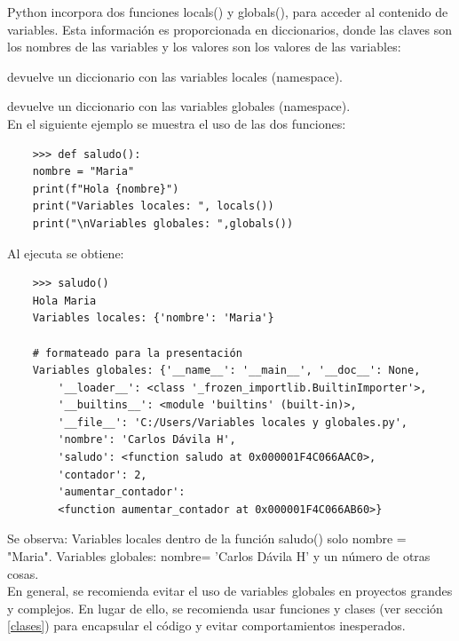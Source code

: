 

Python incorpora dos funciones {\ttfamily locals()} y {\ttfamily globals()}, para acceder al contenido de variables. Esta información es proporcionada en diccionarios, donde las {\ttfamily claves} son los nombres de las variables y los {\ttfamily valores} son los valores de las variables:

  devuelve un diccionario con las variables locales (namespace).

 devuelve un diccionario con las  variables globales (namespace).\\

En el siguiente ejemplo se muestra el uso de las dos funciones:

\begin{lstlisting}
	>>> def saludo():
	nombre = "Maria"
	print(f"Hola {nombre}")
	print("Variables locales: ", locals())
	print("\nVariables globales: ",globals())
\end{lstlisting}
Al ejecuta se obtiene:
\begin{lstlisting}
	>>> saludo()
	Hola Maria
	Variables locales: {'nombre': 'Maria'}
	
	# formateado para la presentación
	Variables globales: {'__name__': '__main__', '__doc__': None,
		'__loader__': <class '_frozen_importlib.BuiltinImporter'>,
		'__builtins__': <module 'builtins' (built-in)>,
		'__file__': 'C:/Users/Variables locales y globales.py',
		'nombre': 'Carlos Dávila H',
		'saludo': <function saludo at 0x000001F4C066AAC0>,
		'contador': 2,
		'aumentar_contador':
		<function aumentar_contador at 0x000001F4C066AB60>}
\end{lstlisting}Se observa:  Variables locales dentro de la función  {\ttfamily saludo()}  solo {\ttfamily nombre = {}"{}Maria{}"{}}. Variables globales: {\ttfamily nombre= {}'{}Carlos Dávila H{}'{}} y un número de otras cosas.\\

En general, se recomienda evitar el uso de variables globales en proyectos grandes y complejos. En lugar de ello, se recomienda usar funciones y clases (ver sección \ref{clases}) para encapsular el código y evitar comportamientos inesperados.

